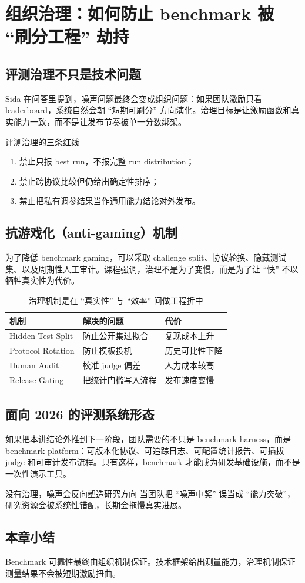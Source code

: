 \section{组织治理：如何防止 benchmark 被 ``刷分工程'' 劫持}

\subsection{评测治理不只是技术问题}
Sida 在问答里提到，噪声问题最终会变成组织问题：如果团队激励只看 leaderboard，系统自然会朝 ``短期可刷分'' 方向演化。治理目标是让激励函数和真实能力一致，而不是让发布节奏被单一分数绑架。

\begin{importantbox}{评测治理的三条红线}
\begin{enumerate}
    \item 禁止只报 best run，不报完整 run distribution；
    \item 禁止跨协议比较但仍给出确定性排序；
    \item 禁止把私有调参结果当作通用能力结论对外发布。
\end{enumerate}
\end{importantbox}

\subsection{抗游戏化（anti-gaming）机制}
为了降低 benchmark gaming，可以采取 challenge split、协议轮换、隐藏测试集、以及周期性人工审计。课程强调，治理不是为了变慢，而是为了让 ``快'' 不以牺牲真实性为代价。

\begin{table}[H]
\centering
\begin{tabular}{p{3.1cm}p{3.8cm}p{3.8cm}}
\toprule
\textbf{机制} & \textbf{解决的问题} & \textbf{代价} \\
\midrule
Hidden Test Split & 防止公开集过拟合 & 复现成本上升 \\
Protocol Rotation & 防止模板投机 & 历史可比性下降 \\
Human Audit & 校准 judge 偏差 & 人力成本较高 \\
Release Gating & 把统计门槛写入流程 & 发布速度变慢 \\
\bottomrule
\end{tabular}
\caption{治理机制是在 ``真实性'' 与 ``效率'' 间做工程折中}
\end{table}

\subsection{面向 2026 的评测系统形态}
如果把本讲结论外推到下一阶段，团队需要的不只是 benchmark harness，而是 benchmark platform：可版本化协议、可追踪日志、可配置统计报告、可插拔 judge 和可审计发布流程。只有这样，benchmark 才能成为研发基础设施，而不是一次性演示工具。

\begin{warningbox}{没有治理，噪声会反向塑造研究方向}
当团队把 ``噪声中奖'' 误当成 ``能力突破''，研究资源会被系统性错配，长期会拖慢真实进展。
\end{warningbox}

\subsection{本章小结}
Benchmark 可靠性最终由组织机制保证。技术框架给出测量能力，治理机制保证测量结果不会被短期激励扭曲。

